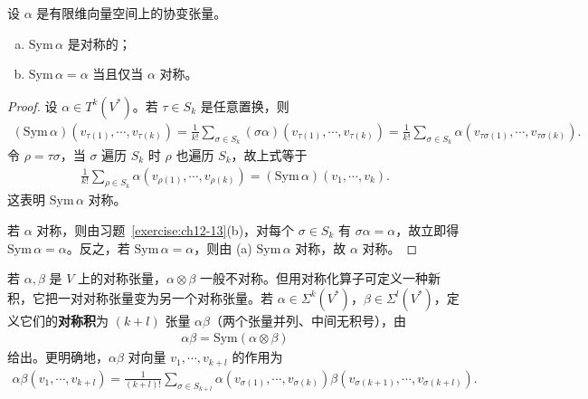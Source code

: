\documentclass[../../main.tex]{subfiles}
\begin{document}
\begin{proposition}[对称化的性质]\label{proposition:ch12-对称化性质}
设 $\alpha$ 是有限维向量空间上的协变张量。
\begin{enumerate}[(a)]
\item $\mathrm{Sym}\,\alpha$ 是对称的；
\item $\mathrm{Sym}\,\alpha=\alpha$ 当且仅当 $\alpha$ 对称。
\end{enumerate}
\end{proposition}

\begin{proof}
设 $\alpha\in T^k(V^*)$。若 $\tau\in S_k$ 是任意置换，则
\begin{align*}
(\mathrm{Sym}\,\alpha)(v_{\tau(1)},\cdots ,v_{\tau(k)})
=\frac{1}{k!}\sum_{\sigma\in S_k}(\sigma\alpha)(v_{\tau(1)},\cdots ,v_{\tau(k)})
=\frac{1}{k!}\sum_{\sigma\in S_k}\alpha(v_{\tau\sigma(1)},\cdots ,v_{\tau\sigma(k)}).
\end{align*}
令 $\rho=\tau\sigma$，当 $\sigma$ 遍历 $S_k$ 时 $\rho$ 也遍历 $S_k$，故上式等于
\begin{align*}
\frac{1}{k!}\sum_{\rho\in S_k}\alpha(v_{\rho(1)},\cdots ,v_{\rho(k)})=(\mathrm{Sym}\,\alpha)(v_1,\cdots ,v_k).
\end{align*}
这表明 $\mathrm{Sym}\,\alpha$ 对称。

若 $\alpha$ 对称，则由习题~\ref{exercise:ch12-13}(b)，对每个 $\sigma\in S_k$ 有 $\sigma\alpha=\alpha$，故立即得 $\mathrm{Sym}\,\alpha=\alpha$。反之，若 $\mathrm{Sym}\,\alpha=\alpha$，则由 (a) $\mathrm{Sym}\,\alpha$ 对称，故 $\alpha$ 对称。
\end{proof}

若 $\alpha,\beta$ 是 $V$ 上的对称张量，$\alpha\otimes\beta$ 一般不对称。但用对称化算子可定义一种新积，它把一对对称张量变为另一个对称张量。若 $\alpha\in\Sigma^k(V^*)$，$\beta\in\Sigma^l(V^*)$，定义它们的\textbf{对称积}为 $(k+l)$ 张量 $\alpha\beta$（两个张量并列、中间无积号），由
\begin{align*}
\alpha\beta=\mathrm{Sym}(\alpha\otimes\beta)
\end{align*}
给出。更明确地，$\alpha\beta$ 对向量 $v_1,\cdots ,v_{k+l}$ 的作用为
\begin{align*}
\alpha\beta(v_1,\cdots ,v_{k+l})=\frac{1}{(k+l)!}\sum_{\sigma\in S_{k+l}}\alpha(v_{\sigma(1)},\cdots ,v_{\sigma(k)})\beta(v_{\sigma(k+1)},\cdots ,v_{\sigma(k+l)}).
\end{align*}
\end{document}
